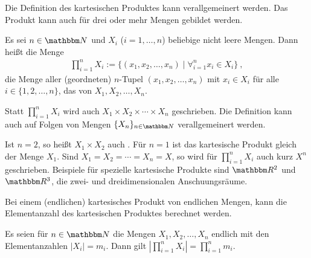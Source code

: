\begin{Unit}
Die Definition des kartesischen Produktes kann verallgemeinert werden. Das 
Produkt kann auch für drei oder mehr Mengen gebildet werden.

\begin{Definition}
  Es sei $n \in \NN$ und $X_i$ ($i = 1, \ldots, n$) beliebige nicht leere 
  Mengen. Dann heißt die Menge
  \begin{align}
    \prod_{i=1}^n X_i := \{ (x_1, x_2, \ldots, x_n) \mid \forall_{i=1}^n x_i 
      \in X_i \} \ ,
  \end{align}
  die Menge aller (geordneten) $n$-Tupel $(x_1, x_2, \ldots, x_n)$ mit $x_i 
  \in X_i$ für alle $i \in \{1, 2, \ldots, n\}$, das  von $X_1, X_2, \ldots , X_n$.
\end{Definition}

Statt $\prod_{i=1}^n X_i$ wird auch $X_1 \times X_2 \times \cdots \times 
X_n$ geschrieben. Die Definition kann auch auf Folgen von Mengen 
$\{ X_n \}_{n \in \NN}$ verallgemeinert werden.

Ist $n = 2$, so heißt $X_1 \times X_2$ auch . Für 
$n = 1$ ist das kartesische Produkt gleich der Menge $X_1$. Sind $X_1 = X_2 = 
\cdots = X_n = X$, so wird für $\prod_{i=1}^n X_i$ auch kurz $X^n$ geschrieben. 
Beispiele für spezielle kartesische Produkte sind $\RR^2$ und $\RR^3$, die zwei- 
und dreidimensionalen Anschuungsräume.
\end{Unit}

\begin{Unit}[Bemerkung]
Bei einem (endlichen) kartesisches Produkt von endlichen Mengen, kann die
Elementanzahl des kartesischen Produktes berechnet werden.

\begin{Bemerkung}
  Es seien für $n \in \mg{N}$ die Mengen $X_1, X_2, \ldots , X_n$ endlich mit 
  den Elementanzahlen $|X_i| = m_i$. Dann gilt $|\prod_{i=1}^n X_i| = 
  \prod_{i=1}^n m_i $.
\end{Bemerkung}
\end{Unit}
